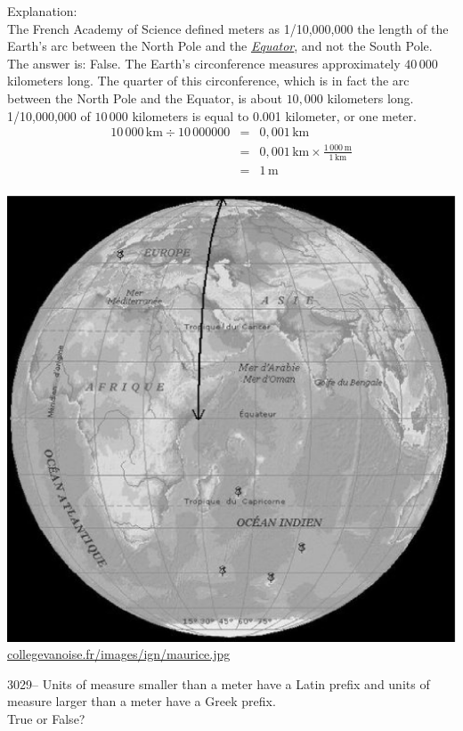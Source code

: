 \documentclass[letterpaper, 12pt]{article}
\begin{document}
Explanation:\\
The French Academy of Science defined meters as 1/10,000,000 the length of the Earth's arc between the North Pole and the \emph{\underline{Equator}}, and not the South Pole. The answer is: False. The Earth's circonference measures approximately $40\,000$ kilometers long. The quarter of this circonference, which is in fact the arc between the North Pole and the Equator, is about $10,000$ kilometers long. 1/10,000,000 of $10\,000$ kilometers is equal to 0.001 kilometer, or one meter.
\begin{eqnarray*}
10\,000\,\text{km} \div 10\,000 000 &=& 0,001\,\text{km}\\
&=& 0,001\,\text{km} \times \frac{1\,000\,\text{m}}{1\,\text{km}}\\
&=& 1\,\text{m}\\
\end{eqnarray*}
\begin{center}
\includegraphics[scale=0.25]{terre.eps}\\
\href{http://collegevanoise.fr/images/ign/maurice.jpg}{collegevanoise.fr/images/ign/maurice.jpg}\\[5mm]
\end{center}



3029-- Units of measure smaller than a meter have a Latin prefix and units of measure larger than a meter have a Greek prefix.\\
True or False?\\
\end{document}
